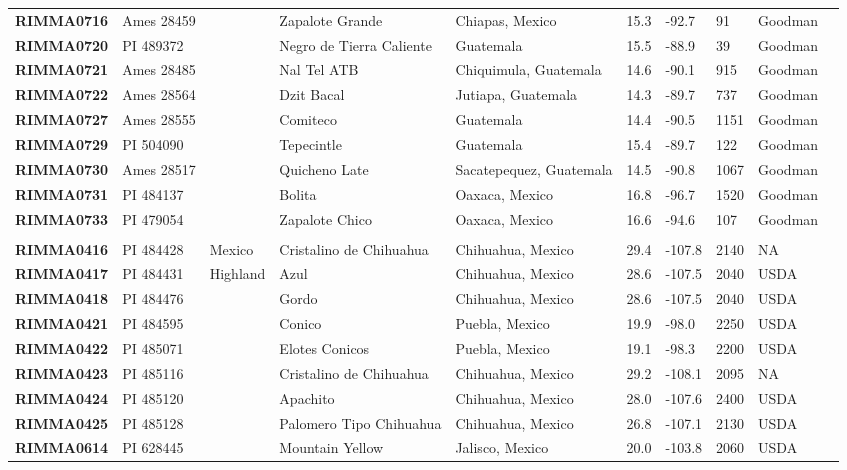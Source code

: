 \begin{table}[h]
\begin{center}
{\begin{tabular}{llllllllll}
{\bf RIMMA0716}	&	Ames 28459	&		&	Zapalote Grande	&	Chiapas, Mexico	&	15.3 	&	-92.7 	&	91	&	Goodman	\\
{\bf RIMMA0720}	&	PI 489372	&		&	Negro de Tierra Caliente	&	Guatemala	&	15.5 	&	-88.9 	&	39	&	Goodman	\\
{\bf RIMMA0721}	&	Ames 28485	&		&	Nal Tel ATB	&	Chiquimula, Guatemala	&	14.6 	&	-90.1 	&	915	&	Goodman	\\
{\bf RIMMA0722}	&	Ames 28564	&		&	Dzit Bacal	&	Jutiapa, Guatemala	&	14.3 	&	-89.7 	&	737	&	Goodman	\\
{\bf RIMMA0727}	&	Ames 28555	&		&	Comiteco	&	Guatemala	&	14.4 	&	-90.5 	&	1151	&	Goodman	\\
{\bf RIMMA0729}	&	PI 504090	&		&	Tepecintle	&	Guatemala	&	15.4 	&	-89.7 	&	122	&	Goodman	\\
{\bf RIMMA0730}	&	Ames 28517	&		&	Quicheno Late	&	Sacatepequez, Guatemala	&	14.5 	&	-90.8 	&	1067	&	Goodman	\\
{\bf RIMMA0731}	&	PI 484137	&		&	Bolita	&	Oaxaca, Mexico	&	16.8 	&	-96.7 	&	1520	&	Goodman	\\
{\bf RIMMA0733}	&	PI 479054	&		&	Zapalote Chico	&	Oaxaca, Mexico	&	16.6 	&	-94.6 	&	107	&	Goodman	\\
	\hline 
	& & & \\[-4mm] 
{\bf RIMMA0416}	&	PI 484428	&	Mexico	&	Cristalino de Chihuahua	&	Chihuahua, Mexico	&	29.4 	&	-107.8 	&	2140	&	NA	\\
{\bf RIMMA0417}	&	PI 484431	&	Highland	&	Azul	&	Chihuahua, Mexico	&	28.6 	&	-107.5 	&	2040	&	USDA	\\
{\bf RIMMA0418}	&	PI 484476	&		&	Gordo	&	Chihuahua, Mexico	&	28.6 	&	-107.5 	&	2040	&	USDA	\\
{\bf RIMMA0421}	&	PI 484595	&		&	Conico	&	Puebla, Mexico	&	19.9 	&	-98.0 	&	2250	&	USDA	\\
{\bf RIMMA0422}	&	PI 485071	&		&	Elotes Conicos	&	Puebla, Mexico	&	19.1 	&	-98.3 	&	2200	&	USDA	\\
{\bf RIMMA0423}	&	PI 485116	&		&	Cristalino de Chihuahua	&	Chihuahua, Mexico	&	29.2 	&	-108.1 	&	2095	&	NA	\\
{\bf RIMMA0424}	&	PI 485120	&		&	Apachito	&	Chihuahua, Mexico	&	28.0 	&	-107.6 	&	2400	&	USDA	\\
{\bf RIMMA0425}	&	PI 485128	&		&	Palomero Tipo Chihuahua	&	Chihuahua, Mexico	&	26.8 	&	-107.1 	&	2130	&	USDA	\\
{\bf RIMMA0614}	&	PI 628445	&		&	Mountain Yellow	&	Jalisco, Mexico	&	20.0 	&	-103.8 	&	2060	&	USDA	\\

\end{tabular}}
\end{center}
\end{table}
